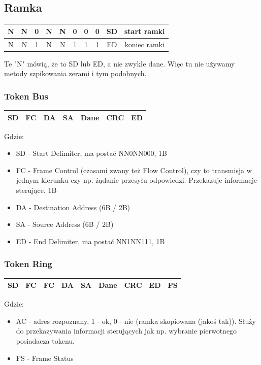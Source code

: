 			\subsection{Ramka}
				\begin{table}[h]
					\begin{tabular}{|c|c|c|c|c|c|c|c|cc}
						\hline
						N & N & 0 & N & N & 0 & 0 & 0 & SD & start ramki \\ \hline
						N & N & 1 & N & N & 1 & 1 & 1 & ED & koniec ramki \\ \hline
					\end{tabular}
				\end{table}
				Te "N" mówią, że to SD lub ED, a nie zwykłe dane. Więc tu nie używamy metody szpikowania zerami i tym podobnych.
				\subsubsection{Token Bus}
					\begin{table}[h]
						\begin{tabular}{|c|c|c|c|c|c|c|}
							\hline
							SD & FC & DA & SA & Dane & CRC & ED \\ \hline
						\end{tabular}
					\end{table}
					Gdzie:
					\begin{itemize}
						\item SD - Start Delimiter, ma postać NN0NN000, 1B
						\item FC - Frame Control (czasami zwany też Flow Control), czy to transmisja w jednym kierunku czy np. żądanie przesyłu odpowiedzi. Przekazuje informacje sterujące. 1B
						\item DA - Destination Address (6B / 2B)
						\item SA - Source Address (6B / 2B)
						\item ED - End Delimiter, ma postać NN1NN111, 1B
					\end{itemize}
				\subsubsection{Token Ring}
					\begin{table}[h]
						\begin{tabular}{|c|c|c|c|c|c|c|c|c|}
							\hline
							SD & FC & FC & DA & SA & Dane & CRC & ED & FS \\ \hline
						\end{tabular}
					\end{table}
					Gdzie:
					\begin{itemize}
						\item AC - adres rozpoznany, 1 - ok, 0 - nie (ramka skopiowana (jakoś tak)). Służy do przekazywania informacji sterujących jak np. wybranie pierwotnego posiadacza tokenu.
						\item FS - Frame Status
					\end{itemize}
